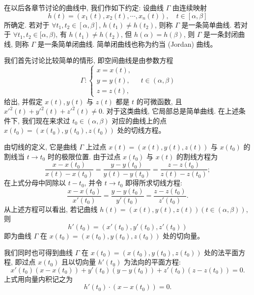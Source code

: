 \documentclass[UTF8,12pt,a4paper,fontset=fandol]{ctexart}
\begin{document}
在以后各章节讨论的曲线中, 我们作如下约定: 设曲线 $\Gamma$ 由连续映射
\[
  h(t)=(x_1(t),x_2(t),\cdots,x_n(t)),\quad t\in[\alpha,\beta]
\]
所确定. 若对于 $\forall t_1,t_2\in[\alpha,\beta]$, $h(t_1)\ne h(t_2)$, 则称 $\Gamma$ 是一条简单曲线. 若对于 $\forall t_1,t_2\in[\alpha,\beta)$, 有 $h(t_1)\ne h(t_2)$, 但 $h(\alpha)=h(\beta)$, 则 $\Gamma$ 是一条封闭曲线, 则称 $\Gamma$ 是一条简单闭曲线. 简单闭曲线也称为约当 (Jordan) 曲线。

我们首先讨论比较简单的情形, 即空间曲线是由参数方程
\[
  \Gamma:
  \begin{cases}
    x=x(t),\\
    y=y(t),\\
    z=z(t),
  \end{cases}
  \quad t\in(\alpha,\beta)
\]
给出, 并假定 $x(t),y(t)$ 与 $z(t)$ 都是 $t$ 的可微函数, 且 $x'^2(t)+y'^2(t)+z'^2(t)\ne0$. 对于这类曲线, 它局部总是简单曲线. 在上述条件下, 我们现在来求过 $t_0\in(\alpha,\beta)$ 对应的曲线上的点 $x(t_0)=(x(t_0),y(t_0),z(t_0))$ 处的切线方程。

由切线的定义, 它是曲线 $\Gamma$ 上过点 $x(t)=(x(t),y(t),z(t))$ 与 $x(t_0)$ 的割线当 $t\to t_0$ 时的极限位置. 由于过点 $x(t_0)$ 与 $x(t)$ 的割线方程为
\[
  \frac{x-x(t_0)}{x(t)-x(t_0)}
  =
  \frac{y-y(t_0)}{y(t)-y(t_0)}
  =
  \frac{z-z(t_0)}{z(t)-z(t_0)};
\]
在上式分母中同除以 $t-t_0$, 并令 $t\to t_0$ 即得所求切线方程:
\[
  \frac{x-x(t_0)}{x'(t_0)}
  =
  \frac{y-y(t_0)}{y'(t_0)}
  =
  \frac{z-z(t_0)}{z'(t_0)}.
\]
从上述方程可以看出, 若记曲线 $h(t)=(x(t),y(t),z(t))(t\in(\alpha,\beta))$, 则
\[
  h'(t_0)=(x'(t_0),y'(t_0),z'(t_0))
\]
即为曲线 $\Gamma$ 在 $x(t_0)=(x(t_0),y(t_0),z(t_0))$ 处的切向量。

我们同时也可得到曲线 $\Gamma$ 在 $x(t_0)=(x(t_0),y(t_0),z(t_0))$ 处的法平面方程, 即过点 $x(t_0)$ 且以切向量 $h'(t_0)$ 为法向的平面方程:
\[
  x'(t_0)(x-x(t_0))+y'(t_0)(y-y(t_0))+z'(t_0)(z-z(t_0))=0.
\]
上式用向量内积记之为
\[
  h'(t_0)\cdot(x-x(t_0))=0.
\]
\end{document}
